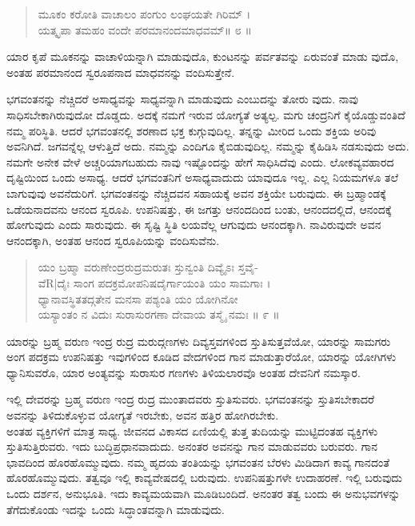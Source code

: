 \begin{verse}
ಮೂಕಂ ಕರೋತಿ ವಾಚಾಲಂ ಪಂಗುಂ ಲಂಘಯತೇ ಗಿರಿಮ್ ।\\ಯತ್ಕೃಪಾ ತಮಹಂ ವಂದೇ ಪರಮಾನಂದಮಾಧವಮ್\num{॥ ೮ ॥}
\end{verse}

{\small ಯಾರ ಕೃಪೆ ಮೂಕನನ್ನು ವಾಚಾಳಿಯನ್ನಾಗಿ ಮಾಡುವುದೊ, ಕುಂಟನನ್ನು ಪರ್ವತವನ್ನು ಏರುವಂತೆ ಮಾಡು ವುದೊ, ಅಂತಹ ಪರಮಾನಂದ ಸ್ವರೂಪನಾದ ಮಾಧವನನ್ನು ವಂದಿಸುತ್ತೇನೆ.}

ಭಗವಂತನನ್ನು ನೆಚ್ಚಿದರೆ ಅಸಾಧ್ಯವನ್ನು ಸಾಧ್ಯವನ್ನಾಗಿ ಮಾಡುವುದು ಎಂಬುದನ್ನು ತೋರು ವುದು. ನಾವು ಸಾಧಿಸಬೇಕಾಗಿರುವುದೋ ದೊಡ್ಡದು. ಅದಕ್ಕೆ ನಮಗೆ ಇರುವ ಯೋಗ್ಯತೆ ಅತ್ಯಲ್ಪ. ಮಗು ಚಂದ್ರನಿಗೆ ಕೈಯೊಡ್ಡುವಂತಿದೆ ನಮ್ಮ ಪರಿಸ್ಥಿತಿ. ಆದರೆ ಭಗವಂತನಲ್ಲಿ ಶರಣಾದ ಭಕ್ತ ಕುಗ್ಗುವುದಿಲ್ಲ. ತನ್ನನ್ನು ಮೀರಿದ ಒಂದು ಶಕ್ತಿಯ ಅರಿವು ಅವನಿಗಿದೆ. ಜಗವನ್ನೆಲ್ಲ ಆಳುತ್ತಿದೆ ಅದು. ನಮ್ಮನ್ನು ಎಂದಿಗೂ ಕೈಬಿಡುವುದಿಲ್ಲ. ನಮ್ಮನ್ನು ಕೈಹಿಡಿಸಿ ನಡಸುವುದು ಅದು. ನಮಗೇ ಅನೇಕ ವೇಳೆ ಅಚ್ಚರಿಯಾಗಬಹುದು ನಾವು ಇಷ್ಟೊಂದನ್ನು ಹೇಗೆ ಸಾಧಿಸಿದೆವು ಎಂದು. ಲೋಕವ್ಯವಹಾರದ ದೃಷ್ಟಿಯಿಂದ ಒಂದು ಅಸಾಧ್ಯ. ಆದರೆ ಭಗವಂತನಿಗೆ ಅಸಾಧ್ಯವಾದುದು ಯಾವುದೂ ಇಲ್ಲ. ಎಲ್ಲ ನಿಯಮಗಳೂ ತಲೆ ಬಾಗುವುವು ಅವನೆದುರಿಗೆ. ಭಗವಂತನನ್ನು ನೆಚ್ಚಿದವನ ಸಹಾಯಕ್ಕೆ ಅವನ ಶಕ್ತಿಯೇ ಬರುವುದು. ಈ ಬ್ರಹ್ಮಾಂಡಕ್ಕೆ ಒಡೆಯನಾದವನು ಆನಂದ ಸ್ವರೂಪಿ. ಉಪನಿಷತ್ತು, ಈ ಜಗತ್ತು ಆನಂದದಿಂದ ಬಂತು, ಆನಂದದಲ್ಲಿದೆ, ಆನಂದಕ್ಕೆ ಹೋಗುವುದು ಎಂದು ಸಾರುವುದು. ಈ ಸೃಷ್ಟಿ ಸ್ಥಿತಿ ಲಯವೆಲ್ಲ ಆಗುವುದು ಆನಂದಕ್ಕಾಗಿ. ನಾವಿರುವುದೇ ಅವನ ಆನಂದಕ್ಕಾಗಿ, ಅಂತಹ ಆನಂದ ಸ್ವರೂಪಿಯನ್ನು ವಂದಿಸುವೆನು.

\begin{verse}
ಯಂ ಬ್ರಹ್ಮಾ ವರುಣೇಂದ್ರರುದ್ರಮರುತಃ ಸ್ತುನ್ವಂತಿ ದಿವ್ಯೈಽಃ ಸ್ತವೈ-\\ವೆR|ದೈಃ ಸಾಂಗ ಪದಕ್ರಮೋಪನಿಷದೈರ್ಗಾಯಂತಿ ಯಂ ಸಾಮಗಾಃ ।\\ಧ್ಯಾನಾವಸ್ಥಿತತದ್ಗತೇನ ಮನಸಾ ಪಶ್ಯಂತಿ ಯಂ ಯೋಗಿನೋ \\ಯಸ್ಯಾಂತಂ ನ ವಿದುಃ ಸುರಾಸುರಗಣಾ ದೇವಾಯ ತಸ್ಮೈ ನಮಃ \num{॥ ೯ ॥}
\end{verse}

{\small ಯಾರನ್ನು ಬ್ರಹ್ಮ ವರುಣ ಇಂದ್ರ ರುದ್ರ ಮರುದ್ಗಣಗಳು ದಿವ್ಯಸ್ತವಗಳಿಂದ ಸ್ತುತಿಸುತ್ತವೆಯೋ, ಯಾರನ್ನು ಸಾಮಗರು ಅಂಗ ಪದಕ್ರಮ ಉಪನಿಷತ್ತು ಇವುಗಳಿಂದ ಕೂಡಿದ ವೇದಗಳಿಂದ ಗಾನ ಮಾಡುತ್ತಾರೆಯೋ, ಯಾರನ್ನು ಯೋಗಿಗಳು ಧ್ಯಾನಿಸುವರೊ, ಯಾರ ಅಂತ್ಯವನ್ನು ಸುರಾಸುರ ಗಣಗಳು ತಿಳಿಯಲಾರವೊ ಅಂತಹ ದೇವನಿಗೆ ನಮಸ್ಕಾರ.}

ಇಲ್ಲಿ ದೇವರನ್ನು ಬ್ರಹ್ಮ ವರುಣ ಇಂದ್ರ ರುದ್ರ ಮುಂತಾದವರು ಸ್ತುತಿಸುವರು. ಭಗವಂತನನ್ನು ಸ್ತುತಿಸಬೇಕಾದರೆ ಅವನನ್ನು ತಿಳಿದುಕೊಳ್ಳುವ ಯೋಗ್ಯತೆ ಇರಬೇಕು, ಅವನ ಹತ್ತಿರ ಹೋಗಿರಬೇಕು.\\ಅಂತಹ ವ್ಯಕ್ತಿಗಳಿಗೆ ಮಾತ್ರ ಸಾಧ್ಯ. ಜೀವನದ ವಿಕಾಸದ ಏಣಿಯಲ್ಲಿ ತುತ್ತ ತುದಿಯನ್ನು ಮುಟ್ಟಿದಂತಹ ವ್ಯಕ್ತಿಗಳು ಸ್ತುತಿಸುತ್ತಿರುವರು. ಇದು ಬುದ್ಧಿಪ್ರಧಾನವಾದುದು. ಅನಂತರ ಅವನನ್ನು ಗಾನ ಮಾಡುವವರು ಬರುವರು. ಗಾನ ಭಾವದಿಂದ ಹೊರಹೊಮ್ಮುವುದು. ನಮ್ಮ ಹೃದಯ ತಂತಿಯನ್ನು ಭಗವಂತನ ಬೆರಳು ಮಿಡಿದಾಗ ಕಾವ್ಯ ಗಾನದಂತೆ ಹೊರಹೊಮ್ಮುವುದು. ತತ್ವವೂ ಇಲ್ಲಿ ಕಾವ್ಯವೇಷದಲ್ಲಿ ಬರುವುದು. ಉಪನಿಷತ್ತುಗಳೇ ಉದಾಹರಣೆ. ಇಲ್ಲಿ ಬರುವುದು ಒಂದು ದರ್ಶನ, ಅನುಭೂತಿ. ಇದು ಕಾವ್ಯಮಯವಾಗಿ ಮೂಡಿಬಂದಿದೆ. ಅನಂತರ ತತ್ವ ಬಂದು ಈ ಅನುಭವಗಳನ್ನು ತೆಗೆದುಕೊಂಡು ಇದನ್ನು ಒಂದು ಸಿದ್ಧಾಂತವನ್ನಾಗಿ ಮಾಡುವುದು.

